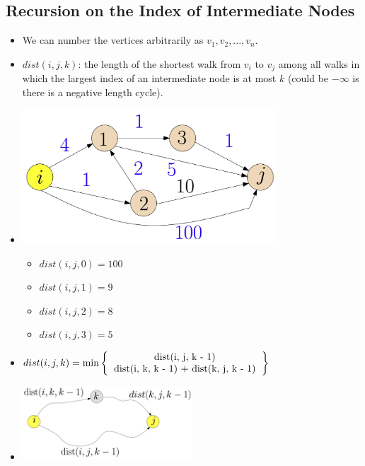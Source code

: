 \documentclass[12pt]{article}
\begin{document}
\subsection{Recursion on the Index of Intermediate Nodes}
\begin{itemize}
    \item We can number the vertices arbitrarily as $v_1, v_2, ..., v_n$.
    \item $dist(i, j, k)$: the length of the shortest walk from $v_i$ to $v_j$ among all walks in which the largest index of an intermediate node is at most $k$ (could be $-\infty$ is there is a negative length cycle).
    \item[] \begin{center}
        \includegraphics[width=0.75\textwidth]{images/all-pairs-dist-example.jpg}
    \end{center}
    \begin{itemize}
        \item $dist(i, j, 0) = 100$
        \item $dist(i, j, 1) = 9$
        \item $dist(i, j, 2) = 8$
        \item $dist(i, j, 3) = 5$
    \end{itemize}
    \item $dist(i, j, k) = \min \left\{
        \begin{tabular}{c}
            dist(i, j, k - 1) \\
            dist(i, k, k - 1) + dist(k, j, k - 1) \\
        \end{tabular}
    \right\}$
    \item[] \begin{center}
        \includegraphics[width=0.5\textwidth]{images/all-pairs-recursive-example.jpg}

\end{center}
\end{itemize}
\end{document}
